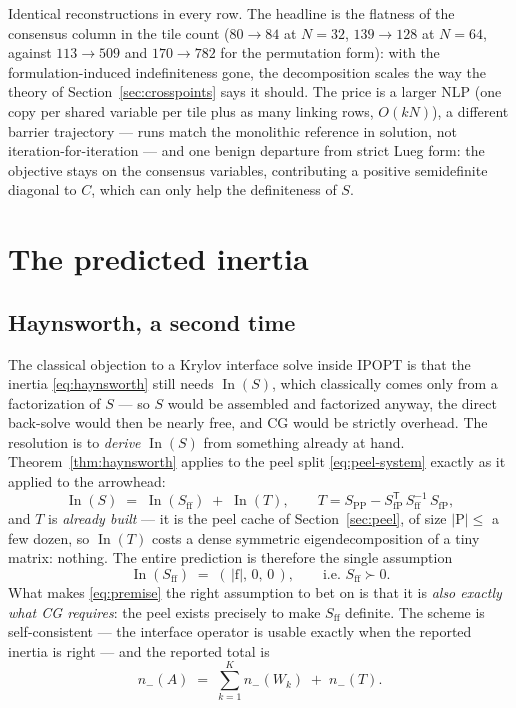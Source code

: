 \documentclass[11pt]{article}
\newcommand{\In}{\operatorname{In}}
\newcommand{\Sff}{S_{\mathrm{ff}}}
\newcommand{\SfP}{S_{\mathrm{fP}}}
\newcommand{\SPP}{S_{\mathrm{PP}}}
\begin{document}
Identical reconstructions in every row.  The headline is the flatness of the
consensus column in the tile count ($80 \to 84$ at $N=32$, $139 \to 128$ at
$N=64$, against $113 \to 509$ and $170 \to 782$ for the permutation form):
with the formulation-induced indefiniteness gone, the decomposition scales
the way the theory of Section~\ref{sec:crosspoints} says it should.  The
price is a larger NLP (one copy per shared variable per tile plus as many
linking rows, $O(kN)$), a different barrier trajectory --- runs match the
monolithic reference in solution, not iteration-for-iteration --- and one
benign departure from strict Lueg form: the objective stays on the consensus
variables, contributing a positive semidefinite diagonal to $C$, which can
only help the definiteness of $S$.

\section{The predicted inertia}
\label{sec:inertia-pred}

\subsection{Haynsworth, a second time}

The classical objection to a Krylov interface solve inside IPOPT is that the
inertia \eqref{eq:haynsworth} still needs $\In(S)$, which classically comes
only from a factorization of $S$ --- so $S$ would be assembled and factorized
anyway, the direct back-solve would then be nearly free, and CG would be
strictly overhead.  The resolution is to \emph{derive} $\In(S)$ from
something already at hand.  Theorem~\ref{thm:haynsworth} applies to the peel
split \eqref{eq:peel-system} exactly as it applied to the arrowhead:
\begin{equation}
  \In(S) \;=\; \In(\Sff) \;+\; \In(T),
  \qquad T = \SPP - \SfP^{\mathsf T}\, \Sff^{-1}\, \SfP,
  \label{eq:haynsworth2}
\end{equation}
and $T$ is \emph{already built} --- it is the peel cache of
Section~\ref{sec:peel}, of size $|\mathrm P| \le$ a few dozen, so $\In(T)$
costs a dense symmetric eigendecomposition of a tiny matrix: nothing.
The entire prediction is therefore the single assumption
\begin{equation}
  \In(\Sff) \;=\; (\,|\mathrm f|,\,0,\,0\,),
  \qquad\text{i.e.\ } \Sff \succ 0.
  \label{eq:premise}
\end{equation}
What makes \eqref{eq:premise} the right assumption to bet on is that it is
\emph{also exactly what CG requires}: the peel exists precisely to make
$\Sff$ definite.  The scheme is self-consistent --- the interface operator is
usable exactly when the reported inertia is right --- and the reported total
is
\begin{equation}
  n_-(A) \;=\; \sum_{k=1}^K n_-(W_k) \;+\; n_-(T).
  \label{eq:reported}
\end{equation}
\end{document}
